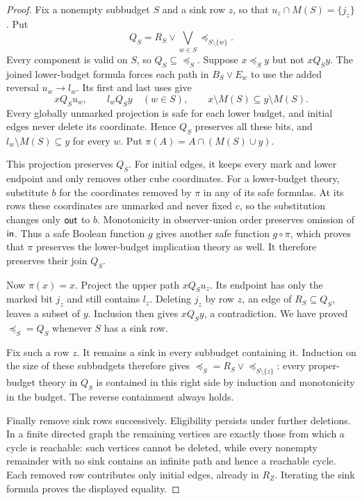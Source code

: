 \begin{proof}
Fix a nonempty subbudget $S$ and a sink row $z$, so that
$u_z\cap M(S)=\{j_z\}$. Put
\[
 Q_S=R_S\vee\bigvee_{w\in S}\preceq_{S\setminus\{w\}}.
\]
Every component is valid on $S$, so $Q_S\subseteq\preceq_S$.
Suppose $x\preceq_Sy$ but not $xQ_Sy$. The joined lower-budget formula
forces each path in $B_S\vee E_w$ to use the added reversal
$u_w\to l_w$. Its first and last uses give
\[
 xQ_Su_w,\qquad l_wQ_Sy\quad(w\in S),\qquad
 x\setminus M(S)\subseteq y\setminus M(S).
\]
Every globally unmarked projection is safe for each lower budget, and
initial edges never delete its coordinate. Hence $Q_S$ preserves all
these bits, and $l_w\setminus M(S)\subseteq y$ for every $w$.
Put $\pi(A)=A\cap(M(S)\cup y)$.

This projection preserves $Q_S$. For initial edges, it keeps every mark
and lower endpoint and only removes other cube coordinates.
For a lower-budget theory, substitute $b$ for the coordinates removed
by $\pi$ in any of its safe formulas. At its rows these coordinates
are unmarked and never fixed $c$, so the substitution changes only
$\mathsf{out}$ to $b$. Monotonicity in observer-union order preserves omission
of $\mathsf{in}$. Thus a safe Boolean function $g$ gives another safe function
$g\circ\pi$, which proves that $\pi$ preserves the lower-budget
implication theory as well. It therefore preserves their join $Q_S$.

Now $\pi(x)=x$. Project the upper path $xQ_Su_z$.
Its endpoint has only the marked bit $j_z$ and still contains $l_z$.
Deleting $j_z$ by row $z$, an edge of $R_S\subseteq Q_S$, leaves a
subset of $y$. Inclusion then gives $xQ_Sy$, a contradiction. We have
proved $\preceq_S=Q_S$ whenever $S$ has a sink row.

Fix such a row $z$. It remains a sink in every subbudget containing it.
Induction on the size of these subbudgets therefore gives
$\preceq_S=R_S\vee\preceq_{S\setminus\{z\}}$: every proper-budget
theory in $Q_S$ is contained in this right side by induction and
monotonicity in the budget. The reverse containment always holds.

Finally remove sink rows successively. Eligibility persists under
further deletions. In a finite directed graph the remaining vertices
are exactly those from which a cycle is reachable: such vertices cannot
be deleted, while every nonempty remainder with no sink contains an
infinite path and hence a reachable cycle. Each removed row contributes
only initial edges, already in $R_Z$. Iterating the sink formula proves
the displayed equality.
\end{proof}

